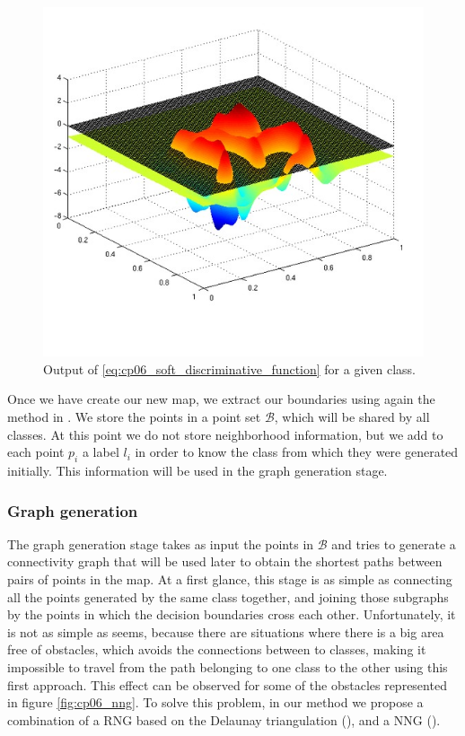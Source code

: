 \begin{figure}[h!]
  \centering
  \includegraphics[width=\textwidth, trim=0 0 0 0,clip]{figure2}
  \caption{Output of \ref{eq:cp06_soft_discriminative_function} for a given class.}
  \label{fig:cp06_decision_boundary_3d}
\end{figure}

Once we have create our new map, we extract our boundaries using again the method in \cite{suzuki1985topological}. We store the points in a point set $\mathcal{B}$, which will be shared by all classes. At this point we do not store neighborhood information, but we add to each point $p_i$ a label $l_i$ in order to know the class from which they were generated initially. This information will be used in the graph generation stage.

\subsubsection{Graph generation}\label{ch:chapter06_01_01_05}

The graph generation stage takes as input the points in $\mathcal{B}$ and tries to generate a connectivity graph that will be used later to obtain the shortest paths between pairs of points in the map. At a first glance, this stage is as simple as connecting all the points generated by the same class together, and joining those subgraphs by the points in which the decision boundaries cross each other. Unfortunately, it is not as simple as seems, because there are situations where there is a big area free of obstacles, which avoids the connections between to classes, making it impossible to travel from the path belonging to one class to the other using this first approach. This effect can be observed for some of the obstacles represented in figure \ref{fig:cp06_nng}.
To solve this problem, in our method we propose a combination of a \acf{RNG} based on the Delaunay triangulation (\cite{lingas1994linear}), and a \acf{NNG} (\cite{eppstein1997nearest}).

